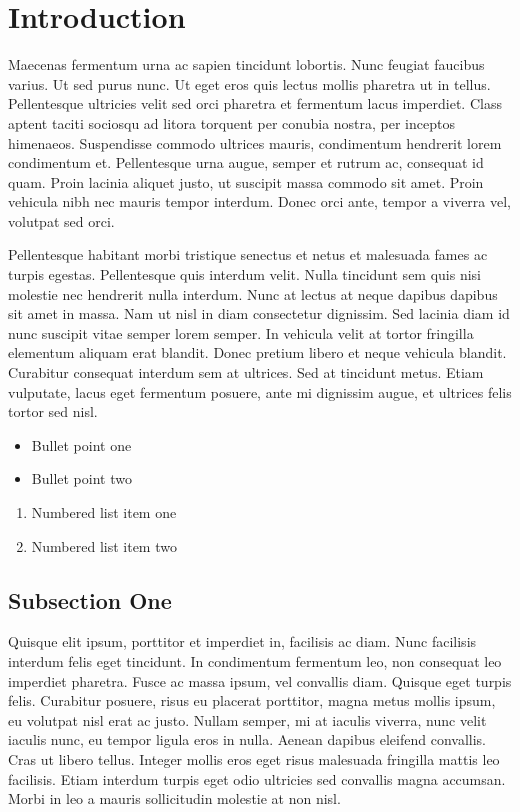 \documentclass[preprint,12pt]{elsarticle}
\begin{document}
\linenumbers

\section{Introduction}
\label{S:1}

Maecenas \cite{Smith:2012qr} fermentum \cite{Smith:2013jd} urna ac sapien tincidunt lobortis. Nunc feugiat faucibus varius. Ut sed purus nunc. Ut eget eros quis lectus mollis pharetra ut in tellus. Pellentesque ultricies velit sed orci pharetra et fermentum lacus imperdiet. Class aptent taciti sociosqu ad litora torquent per conubia nostra, per inceptos himenaeos. Suspendisse commodo ultrices mauris, condimentum hendrerit lorem condimentum et. Pellentesque urna augue, semper et rutrum ac, consequat id quam. Proin lacinia aliquet justo, ut suscipit massa commodo sit amet. Proin vehicula nibh nec mauris tempor interdum. Donec orci ante, tempor a viverra vel, volutpat sed orci.

Pellentesque habitant morbi tristique senectus et netus et malesuada fames ac turpis egestas. Pellentesque quis interdum velit. Nulla tincidunt sem quis nisi molestie nec hendrerit nulla interdum. Nunc at lectus at neque dapibus dapibus sit amet in massa. Nam ut nisl in diam consectetur dignissim. Sed lacinia diam id nunc suscipit vitae semper lorem semper. In vehicula velit at tortor fringilla elementum aliquam erat blandit. Donec pretium libero et neque vehicula blandit. Curabitur consequat interdum sem at ultrices. Sed at tincidunt metus. Etiam vulputate, lacus eget fermentum posuere, ante mi dignissim augue, et ultrices felis tortor sed nisl.

\begin{itemize}
\item Bullet point one
\item Bullet point two
\end{itemize}

\begin{enumerate}
\item Numbered list item one
\item Numbered list item two
\end{enumerate}

\subsection{Subsection One}

Quisque elit ipsum, porttitor et imperdiet in, facilisis ac diam. Nunc facilisis interdum felis eget tincidunt. In condimentum fermentum leo, non consequat leo imperdiet pharetra. Fusce ac massa ipsum, vel convallis diam. Quisque eget turpis felis. Curabitur posuere, risus eu placerat porttitor, magna metus mollis ipsum, eu volutpat nisl erat ac justo. Nullam semper, mi at iaculis viverra, nunc velit iaculis nunc, eu tempor ligula eros in nulla. Aenean dapibus eleifend convallis. Cras ut libero tellus. Integer mollis eros eget risus malesuada fringilla mattis leo facilisis. Etiam interdum turpis eget odio ultricies sed convallis magna accumsan. Morbi in leo a mauris sollicitudin molestie at non nisl.
\end{document}
